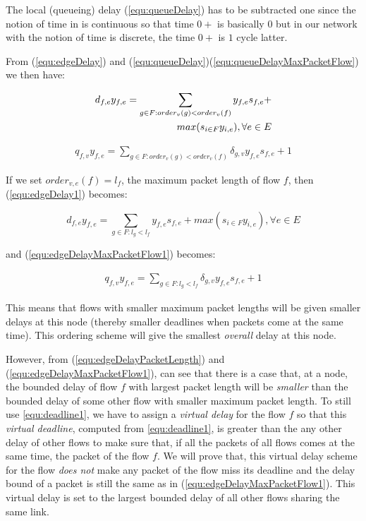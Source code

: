 \documentclass[conference, twocolumn]{IEEEtran}
\theoremstyle{definition}
\begin{document}
The local (queueing) delay (\ref{equ:queueDelay}) has to be subtracted one since
the notion of time in \cite{Ferrari90ascheme} is continuous so that time $0+$ is basically $0$ but in
our network with the notion of time is discrete, the time $0+$ is $1$ cycle
latter.

From (\ref{equ:edgeDelay}) and
(\ref{equ:queueDelay})(\ref{equ:queueDelayMaxPacketFlow}) we then have:

\begin{eqnarray}\label{equ:edgeDelay1}
d_{f,e}y_{f,e} = \sum_{g \in F:order_v(g) < order_v(f)}y_{f,e}s_{f,e} + \notag
\\ max(s_{i \in F}y_{i,e}), \forall e \in E
\end{eqnarray}

\begin{eqnarray}\label{equ:edgeDelayMaxPacketFlow1}
q_{f,v}y_{f,e} = \sum_{g \in F:order_v(g) <
order_v(f)}\delta_{g,v}y_{f,e}s_{f,e} + 1
\end{eqnarray}

If we set $order_{v,e}(f)=l_f$, the maximum packet length of flow $f$, then
(\ref{equ:edgeDelay1}) becomes:

\begin{equation}\label{equ:edgeDelayPacketLength}
d_{f,e}y_{f,e} = \sum_{g \in F:l_g < l_f}y_{f,e}s_{f,e} +
max(s_{i \in F}y_{i,e}), \forall e \in E
\end{equation}

and (\ref{equ:edgeDelayMaxPacketFlow1}) becomes:

\begin{eqnarray}\label{equ:edgeDelayMaxPacketFlow1}
q_{f,v}y_{f,e} = \sum_{g \in F:l_g <
l_f}\delta_{g,v}y_{f,e}s_{f,e} + 1
\end{eqnarray}

This means that flows with smaller maximum packet lengths will be given smaller
delays at this node (thereby smaller deadlines when packets come at the same
time). This ordering scheme will give the smallest {\em overall} delay at this node.

However, from (\ref{equ:edgeDelayPacketLength})
and (\ref{equ:edgeDelayMaxPacketFlow1}), can see that there is a case that, at
a node, the bounded delay of flow $f$ with largest packet length will be {\em
smaller} than the bounded delay of some other flow with smaller maximum packet
length. To still use \ref{equ:deadline1}, we have to assign a {\em virtual
delay} for the flow $f$ so that this {\em virtual deadline}, computed from
\ref{equ:deadline1}, is greater than the any other delay of other flows to make
sure that, if all the packets of all flows comes at the same time, the packet
of the flow $f$. We will prove that, this virtual delay scheme for the flow
{\em does not} make any packet of the flow miss its deadline and the delay
bound of a packet is still the same as in (\ref{equ:edgeDelayMaxPacketFlow1}).
This virtual delay is set to the largest bounded delay of all other flows
sharing the same link.
\end{document}
